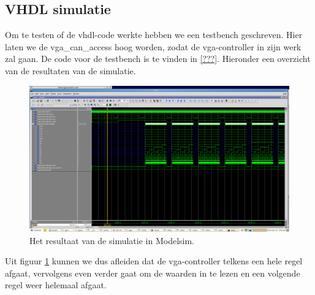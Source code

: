 \documentclass{scrartcl}  %
\begin{document}
\subsection{VHDL simulatie}
Om te testen of de vhdl-code werkte hebben we een testbench geschreven. Hier laten we de vga\_can\_access hoog worden, zodat de vga-controller in zijn werk zal gaan. De code voor de testbench is te vinden in \ref{???}. Hieronder een overzicht van de resultaten van de simulatie.
\begin{figure}[H]
\centering
		\includegraphics[width=1\textwidth]{resource/simmodvgafinal.png}
		
		\caption{Het resultaat van de simulatie in Modelsim.}
		\label{fig:sim}
\end{figure}
Uit figuur \ref{fig:sim} kunnen we dus afleiden dat de vga-controller telkens een hele regel afgaat, vervolgens even verder gaat om de waarden in te lezen en een volgende regel weer helemaal afgaat. 
\end{document}
